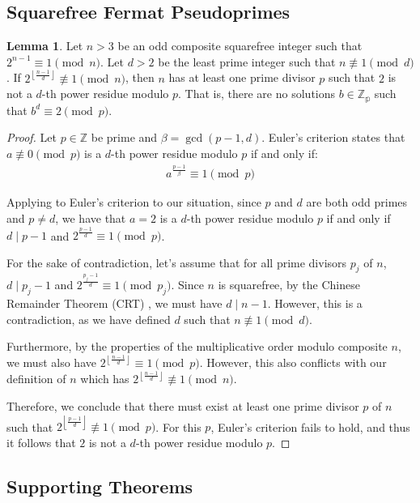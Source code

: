 \documentclass{article}
\theoremstyle{plain}
\theoremstyle{definition}
\newtheorem{lemma}{Lemma}
\newcommand{\floor}[1]{\left\lfloor #1 \right\rfloor}
\begin{document}
\subsection{Squarefree Fermat Pseudoprimes}
\begin{lemma} \label{lemma:nonresidue}
Let $n>3$ be an odd composite squarefree integer such that $2^{n-1} \equiv 1 \pmod{n}$. Let $d > 2$ be the least prime integer such that $n \not\equiv 1 \pmod{d}$. If $2^{\floor{\frac{n-1}{d}}} \not\equiv 1 \pmod{n}$, then $n$ has at least one prime divisor $p$ such that $2$ is not a $d$-th power residue modulo $p$. That is, there are no solutions $b \in \mathbb{Z_p}$ such that $b^d \equiv 2 \pmod{p}$.
\end{lemma}
\begin{proof}
Let $p \in \mathbb{Z}$ be prime and $\beta = \gcd(p-1, d)$. Euler's criterion \cite{euler1914powerresidues} states that $a \not\equiv 0 \pmod p$ is a $d$-th power residue modulo $p$ if and only if:
\begin{align}
a^{\frac{p-1}{\beta}} \equiv 1 \pmod p
\end{align}

Applying to Euler's criterion to our situation, since $p$ and $d$ are both odd primes and $p \not= d$, we have that $a=2$ is a $d$-th power residue modulo $p$ if and only if $d \mid p-1$ and $2^{\frac{p-1}{d}} \equiv 1 \pmod p$.

For the sake of contradiction, let's assume that for all prime divisors $p_j$ of $n$, $d \mid p_j-1$ and $2^{\frac{p_j-1}{d}} \equiv 1 \pmod p_j$. Since $n$ is squarefree, by the Chinese Remainder Theorem (CRT) \cite{cormen2009algorithms}, we must have $d \mid n-1$. However, this is a contradiction, as we have defined $d$ such that $n \not\equiv 1 \pmod{d}$.

Furthermore, by the properties of the multiplicative order modulo composite $n$, we must also have $2^{\floor{\frac{n-1}{d}}} \equiv 1 \pmod p$. However, this also conflicts with our definition of $n$ which has $2^{\floor{\frac{n-1}{d}}} \not\equiv 1 \pmod n$.

Therefore, we conclude that there must exist at least one prime divisor $p$ of $n$ such that $2^{\floor{\frac{p-1}{d}}} \not\equiv 1 \pmod{p}$. For this $p$, Euler's criterion fails to hold, and thus it follows that $2$ is not a $d$-th power residue modulo $p$.
\end{proof}

\subsection{Supporting Theorems}
\end{document}
